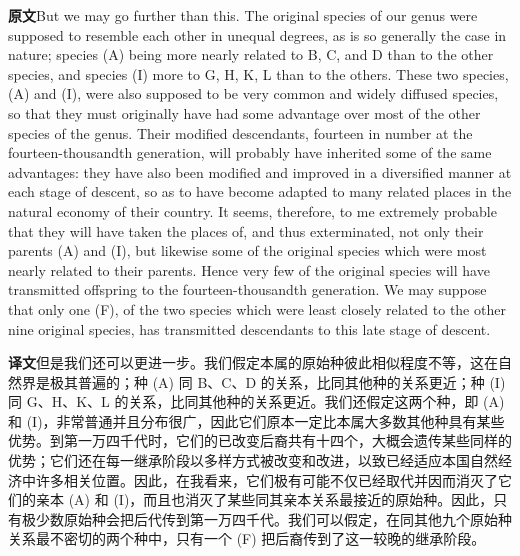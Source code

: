 \documentclass[UTF8,zihao=-4]{ctexart}
\newcommand{\BodyFont}{\fontsize{10.5pt}{15.5pt}\selectfont}
\newcommand{\origlabel}{\textbf{原文}\quad}
\newcommand{\translabel}{\textbf{译文}\quad}
\newenvironment{enblock}{\par\noindent\begingroup\BodyFont\origlabel}{\par\endgroup}
\newenvironment{zhblock}{\par\noindent\begingroup\BodyFont\translabel}{\par\endgroup\vspace{0.35em}}
\newcommand{\pair}[2]{\begin{enblock}#1\end{enblock}\begin{zhblock}#2\end{zhblock}}
\begin{document}
\pair{But we may go further than this. The original species of our genus were supposed to resemble each other in unequal degrees, as is so generally the case in nature; species (A) being more nearly related to B, C, and D than to the other species, and species (I) more to G, H, K, L than to the others. These two species, (A) and (I), were also supposed to be very common and widely diffused species, so that they must originally have had some advantage over most of the other species of the genus. Their modified descendants, fourteen in number at the fourteen-thousandth generation, will probably have inherited some of the same advantages: they have also been modified and improved in a diversified manner at each stage of descent, so as to have become adapted to many related places in the natural economy of their country. It seems, therefore, to me extremely probable that they will have taken the places of, and thus exterminated, not only their parents (A) and (I), but likewise some of the original species which were most nearly related to their parents. Hence very few of the original species will have transmitted offspring to the fourteen-thousandth generation. We may suppose that only one (F), of the two species which were least closely related to the other nine original species, has transmitted descendants to this late stage of descent.}{但是我们还可以更进一步。我们假定本属的原始种彼此相似程度不等，这在自然界是极其普遍的；种 (A) 同 B、C、D 的关系，比同其他种的关系更近；种 (I) 同 G、H、K、L 的关系，比同其他种的关系更近。我们还假定这两个种，即 (A) 和 (I)，非常普通并且分布很广，因此它们原本一定比本属大多数其他种具有某些优势。到第一万四千代时，它们的已改变后裔共有十四个，大概会遗传某些同样的优势；它们还在每一继承阶段以多样方式被改变和改进，以致已经适应本国自然经济中许多相关位置。因此，在我看来，它们极有可能不仅已经取代并因而消灭了它们的亲本 (A) 和 (I)，而且也消灭了某些同其亲本关系最接近的原始种。因此，只有极少数原始种会把后代传到第一万四千代。我们可以假定，在同其他九个原始种关系最不密切的两个种中，只有一个 (F) 把后裔传到了这一较晚的继承阶段。}
\end{document}
